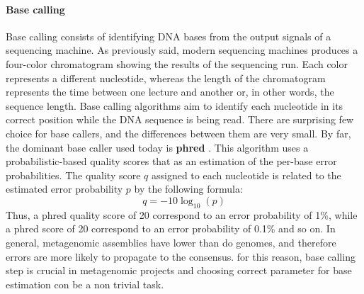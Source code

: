 \paragraph{Base calling}
Base calling consists of identifying DNA bases from the output signals of a sequencing machine. As previously said, modern sequencing machines produces a four-color chromatogram showing the results of the sequencing run. Each color represents a different nucleotide, whereas the length of the chromatogram represents the time between one lecture and another or, in other words, the sequence length. Base calling algorithms aim to identify each nucleotide in its correct position while the DNA sequence is being read. There are surprising few choice for base callers, and the differences between them are very small. By far, the dominant base caller used today is \textbf{phred} \cite{ewing1998base}. This algorithm uses a probabilistic-based quality scores that as an estimation of the per-base error probabilities. The quality score $q$ assigned to each nucleotide is related to the estimated error probability $p$ by the following formula:\\
\begin{equation*}
q = -10 \log_{10}(p)
\end{equation*}
Thus, a phred quality score of 20 correspond to an error probability of 1\%, while a phred score of 20 correspond to an error probability of 0.1\% and so on. In general, metagenomic assemblies have lower than do genomes, and therefore errors are more likely to propagate to the consensus. for this reason, base calling step is crucial in metagenomic projects and choosing correct parameter for base estimation con be a non trivial task.\\%

